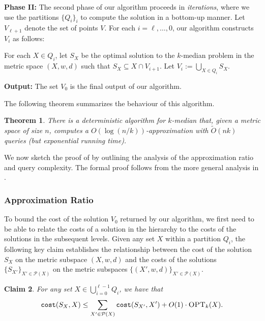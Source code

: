 \documentclass[11pt]{article}
\newenvironment{wrapper}[1]
{
\begin{center}
		\begin{minipage}{\linewidth}
			\begin{mdframed}[hidealllines=true, backgroundcolor=gray!20, leftmargin=0cm,innerleftmargin=0.4cm,innerrightmargin=0.4cm,innertopmargin=0.4cm,innerbottommargin=0.4cm,roundcorner=0pt]
				#1}
			{\end{mdframed}
		\end{minipage}
	\end{center}
}
\newcommand{\1}{\mathmybb{1}}
\newtheorem{theorem}{Theorem}[section]
\newtheorem{claim}[theorem]{Claim}
\newcommand{\OPT}{\textsc{OPT}}
\newcommand{\cost}{\textnormal{\texttt{cost}}}
\begin{document}
\medskip
\noindent
\textbf{Phase II:}
The second phase of our algorithm proceeds in \emph{iterations}, where we use the partitions $\{Q_i\}_i$ to compute the solution in a bottom-up manner.
Let $V_{\ell + 1}$ denote the set of points $V$.
For each $i = \ell ,\dots, 0$, our algorithm constructs $V_i$ as follows:

\begin{wrapper}
    For each $X \in Q_i$, let $S_X$ be the optimal solution to the $k$-median problem in the metric space $(X,w,d)$ such that $S_X \subseteq X \cap V_{i+1}$. Let $V_i := \bigcup_{X \in Q_i} S_X$.
\end{wrapper}

\medskip
\noindent
\textbf{Output:}
The set $V_0$ is the final output of our algorithm.

\medskip

The following theorem summarizes the behaviour of this algorithm.

\begin{theorem}\label{thm:intro:query}
    There is a deterministic algorithm for $k$-median that, given a metric space of size $n$, computes a $O(\log(n/k))$-approximation with $\tilde O(nk)$ queries (but exponential running time).
\end{theorem}



We now sketch the proof of  by outlining the analysis of the approximation ratio and query complexity. The formal proof follows from the more general analysis in .

\subsubsection*{Approximation Ratio}


To bound the cost of the solution $V_0$ returned by our algorithm, we first need to be able to relate the costs of a solution in the hierarchy to the costs of the solutions in the subsequent levels.
Given any set $X$ within a partition $Q_i$, the following key claim establishes the relationship between the cost of the solution $S_X$ on the metric subspace $(X,w,d)$ and the costs of the solutions $\{S_{X'}\}_{X' \in \mathcal P(X)}$ on the metric subspaces $\{(X',w,d)\}_{X' \in \mathcal P(X)}$.


\begin{claim}\label{claim:apx:1}
For any set $X \in \bigcup_{i=0}^{\ell - 1} Q_i$, we have that
$$ \cost(S_X, X) \leq \sum_{X' \in \mathcal P(X)} \cost(S_{X'}, X') + O(1) \cdot \OPT_k(X). $$
\end{claim}
\end{document}
